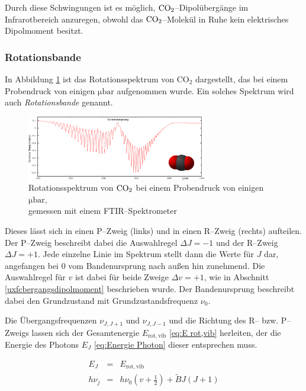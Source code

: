 \documentclass[12pt,a4paper]{scrartcl}
\numberwithin{equation}{section} %
\begin{document}
Durch diese Schwingungen ist es möglich, $\ce{CO_2}$--Dipolübergänge im Infrarotbereich anzuregen, obwohl das $\ce{CO_2}$--Molekül  in Ruhe kein elektrisches Dipolmoment besitzt. \cite{HakenWolf} %

\hypertarget{Rotationsbande}{\subsubsection{Rotationsbande}\label{Rotationsbande}}
In Abbildung \ref{fig:rotationsspektrumCO2} ist das Rotationsspektrum von CO$_2$ dargestellt, das bei einem Probendruck von einigen $\mathrm{\mu bar}$ aufgenommen wurde. Ein solches Spektrum wird auch \emph{Rotationsbande} genannt.

\begin{figure}[h!]
  \centering
  \includegraphics[width=0.7\textwidth]{../media/B1.1/Rotationssprektrum_CO2.png}
  \caption{Rotationsspektrum von $\ce{CO_2}$ bei einem Probendruck von einigen $\mathrm{\mu bar}$,\\
    gemessen mit einem FTIR--Spektrometer \cite{UzK}}
  \label{fig:rotationsspektrumCO2}
\end{figure}

Dieses lässt sich in einen P--Zweig (links) und in einen R--Zweig (rechts) aufteilen. Der P--Zweig beschreibt dabei die Auswahlregel $\Delta J = -1$ und der R--Zweig $\Delta J = +1$. Jede einzelne Linie im Spektrum stellt dann die Werte für $J$ dar, angefangen bei $0$ vom Bandenursprung nach außen hin zunehmend. Die Auswahlregel für $v$ ist dabei für beide Zweige $\Delta v = +1$, wie in Abschnitt \ref{uxfcbergangsdipolmoment} beschrieben wurde. Der Bandenursprung beschreibt dabei den Grundzustand mit Grundzustandsfrequenz $\nu_0$.

Die Übergangsfrequenzen $\nu_{J, J+1}$ und $\nu_{J, J-1}$ und die Richtung des R-- bzw. P--Zweigs lassen sich der Gesamtenergie $E_\mathrm{rot,vib}$ \eqref{eq:E rot,vib} herleiten, der die Energie des Photons $E_J$ \eqref{eq:Energie Photon} dieser entsprechen muss.

\begin{eqnarray}
  E_J &=& E_\mathrm{rot,vib} \\
  h \nu_j &=& h \nu_0 \left(v + \frac{1}{2}\right) + \tilde{B} J (J + 1)
\end{eqnarray}
\end{document}
